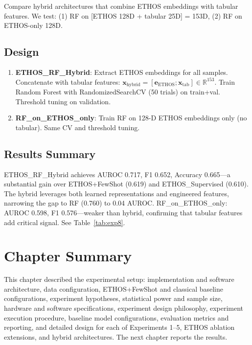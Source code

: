 Compare hybrid architectures that combine ETHOS embeddings with tabular features. We test: (1) RF on [ETHOS 128D + tabular 25D] = 153D, (2) RF on ETHOS-only 128D.

\subsection{Design}

\begin{enumerate}
\item \textbf{ETHOS\_RF\_Hybrid}: Extract ETHOS embeddings for all samples. Concatenate with tabular features: $\mathbf{x}_{\text{hybrid}} = [\mathbf{e}_{\text{ETHOS}}; \mathbf{x}_{\text{tab}}] \in \mathbb{R}^{153}$. Train Random Forest with RandomizedSearchCV (50 trials) on train+val. Threshold tuning on validation.
\item \textbf{RF\_on\_ETHOS\_only}: Train RF on 128-D ETHOS embeddings only (no tabular). Same CV and threshold tuning.
\end{enumerate}

\subsection{Results Summary}

ETHOS\_RF\_Hybrid achieves AUROC 0.717, F1 0.652, Accuracy 0.665---a substantial gain over ETHOS+FewShot (0.619) and ETHOS\_Supervised (0.610). The hybrid leverages both learned representations and engineered features, narrowing the gap to RF (0.760) to 0.04 AUROC. RF\_on\_ETHOS\_only: AUROC 0.598, F1 0.576---weaker than hybrid, confirming that tabular features add critical signal. See Table~\ref{tab:exp8}.

\section{Chapter Summary}

This chapter described the experimental setup: implementation and software architecture, data configuration, ETHOS+FewShot and classical baseline configurations, experiment hypotheses, statistical power and sample size, hardware and software specifications, experiment design philosophy, experiment execution procedure, baseline model configurations, evaluation metrics and reporting, and detailed design for each of Experiments 1--5, ETHOS ablation extensions, and hybrid architectures. The next chapter reports the results.

